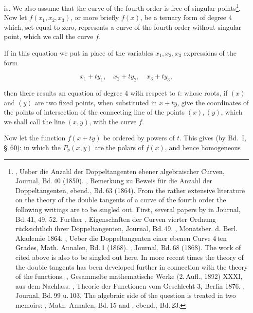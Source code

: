is. We also assume that the curve of the fourth order is free of singular points\footnote{, \glqq Ueber die Anzahl der Doppeltangenten ebener algebraischer Curven\grqq{},  Journal, Bd.\,40 (1850). , \glqq Bemerkung zu  Beweis für die Anzahl der Doppeltangenten\grqq{}, ebend., Bd.\,63 (1864). From the rather extensive literature on the theory of the double tangents of a curve of the fourth order the following writings are to be singled out. First, several papers by  in  Journal, Bd.\,41, 49, 52. Further , Eigenschaften der Curven vierter Ordnung rücksichtlich ihrer Doppeltangenten,  Journal, Bd.\,49. , Monatsber. d. Berl. Akademie 1864. , \glqq Ueber die Doppeltangenten einer ebenen Curve 4\,ten Grades\grqq{}, Math. Annalen, Bd.\,1 (1868). ,  Journal, Bd.\,68 (1868). The work of  cited above is also to be singled out here. In more recent times the theory of the double tangents has been developed further in connection with the theory of the  functions. , Gesammelte mathematische Werke (2.\,Aufl., 1892) XXXI, aus dem Nachlass. , Theorie der  Functionen vom Geschlecht 3, Berlin 1876. ,  Journal, Bd.\,99 u.\,103. The algebraic side of the question is treated in two memoirs: , Math. Annalen, Bd.\,15 and , ebend., Bd.\,23.}. Now let $f(x_1, x_2, x_3)$, or more briefly $f(x)$, be a ternary form of degree 4 which, set equal to zero, represents a curve of the fourth order without singular point, which we call the curve $f$.

If in this equation
we put in place of the variables $x_1, x_2, x_3$ expressions of the form

\[
x_1+t y_1, \quad x_2+t y_2, \quad x_3+t y_3,
\]

then there results an equation of degree 4 with respect to $t$:
whose roots, if $(x)$ and $(y)$ are two fixed points, when substituted in $x+ty$, give the coordinates of the points of intersection of the connecting line of the points $(x), (y)$, which we shall call the line $(x,y)$, with the curve $f$.

Now let the function $f(x+ty)$ be ordered by powers of $t$. This gives (by Bd.\ I, \S.\,60):
in which the $P_\nu(x,y)$ are the polars of $f(x)$, and hence homogeneous
